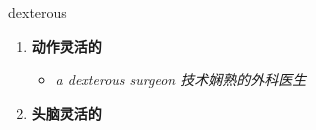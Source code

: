 
\begin{frame}
{\huge dexterous}
\begin{center}
\begin{enumerate}\Large
  \item \textbf{动作灵活的}
  \begin{itemize}
    \item \em{\Large{a dexterous surgeon 技术娴熟的外科医生}}
  \end{itemize}
  \item \textbf{头脑灵活的}
\end{enumerate}
\end{center}
\end{frame}
